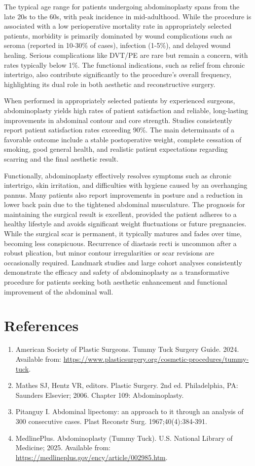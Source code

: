 The typical age range for patients undergoing abdominoplasty spans from the late 20s to the 60s, with peak incidence in mid-adulthood. While the procedure is associated with a low perioperative mortality rate in appropriately selected patients, morbidity is primarily dominated by wound complications such as seroma (reported in 10-30\% of cases), infection (1-5\%), and delayed wound healing. Serious complications like DVT/PE are rare but remain a concern, with rates typically below 1\%. The functional indications, such as relief from chronic intertrigo, also contribute significantly to the procedure's overall frequency, highlighting its dual role in both aesthetic and reconstructive surgery.

When performed in appropriately selected patients by experienced surgeons, abdominoplasty yields high rates of patient satisfaction and reliable, long-lasting improvements in abdominal contour and core strength. Studies consistently report patient satisfaction rates exceeding 90\%. The main determinants of a favorable outcome include a stable postoperative weight, complete cessation of smoking, good general health, and realistic patient expectations regarding scarring and the final aesthetic result.

Functionally, abdominoplasty effectively resolves symptoms such as chronic intertrigo, skin irritation, and difficulties with hygiene caused by an overhanging pannus. Many patients also report improvements in posture and a reduction in lower back pain due to the tightened abdominal musculature. The prognosis for maintaining the surgical result is excellent, provided the patient adheres to a healthy lifestyle and avoids significant weight fluctuations or future pregnancies. While the surgical scar is permanent, it typically matures and fades over time, becoming less conspicuous. Recurrence of diastasis recti is uncommon after a robust plication, but minor contour irregularities or scar revisions are occasionally required. Landmark studies and large cohort analyses consistently demonstrate the efficacy and safety of abdominoplasty as a transformative procedure for patients seeking both aesthetic enhancement and functional improvement of the abdominal wall.

\section*{References}
\begin{enumerate}
  \item American Society of Plastic Surgeons. Tummy Tuck Surgery Guide. 2024. Available from: \url{https://www.plasticsurgery.org/cosmetic-procedures/tummy-tuck}.
  \item Mathes SJ, Hentz VR, editors. Plastic Surgery. 2nd ed. Philadelphia, PA: Saunders Elsevier; 2006. Chapter 109: Abdominoplasty.
  \item Pitanguy I. Abdominal lipectomy: an approach to it through an analysis of 300 consecutive cases. Plast Reconstr Surg. 1967;40(4):384-391.
  \item MedlinePlus. Abdominoplasty (Tummy Tuck). U.S. National Library of Medicine; 2025. Available from: \url{https://medlineplus.gov/ency/article/002985.htm}.
\end{enumerate}

\clearpage

